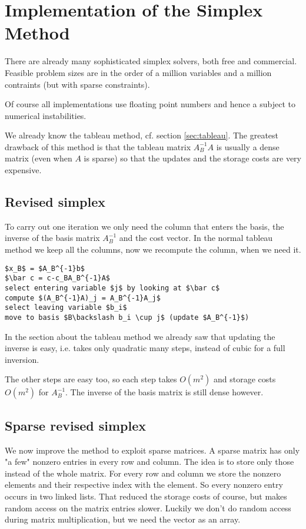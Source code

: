 \section{Implementation of the Simplex Method}

There are already many sophisticated simplex solvers, both free and commercial. Feasible problem sizes are in the order of a million variables and a million contraints (but with sparse constraints). 

Of course all implementations use floating point numbers and hence a subject to numerical instabilities. 

We already know the tableau method, cf. section \ref{sec:tableau}. The greatest drawback of this method is that the tableau matrix $A_B^{-1}A$ is usually a dense matrix (even when $A$ is sparse) so that the updates and the storage costs are very expensive.

\subsection{Revised simplex}

To carry out one iteration we only need the column that enters the basis, the inverse of the basis matrix $A_B^{-1}$ and the cost vector. In the normal tableau method we keep all the columns, now we recompute the column, when we need it.

\begin{lstlisting}
$x_B$ = $A_B^{-1}b$
$\bar c = c-c_BA_B^{-1}A$
select entering variable $j$ by looking at $\bar c$
compute $(A_B^{-1}A)_j = A_B^{-1}A_j$
select leaving variable $b_i$
move to basis $B\backslash b_i \cup j$ (update $A_B^{-1}$)
\end{lstlisting}

In the section about the tableau method we already saw that updating the inverse is easy, i.e. takes only quadratic many steps, instead of cubic for a full inversion. %

The other steps are easy too, so each step takes $O(m^2)$ and storage costs $O(m^2)$ for $A_B^{-1}$. The inverse of the basis matrix is still dense however.

\subsection{Sparse revised simplex}

We now improve the method to exploit sparse matrices. A sparse matrix has only "a few" nonzero entries in every row and column. The idea is to store only those instead of the whole matrix. For every row and column we store the nonzero elements and their respective index with the element. So every nonzero entry occurs in two linked lists. That reduced the storage costs of course, but makes random access on the matrix entries slower. Luckily we don't do random access during matrix multiplication, but we need the vector as an array. 

